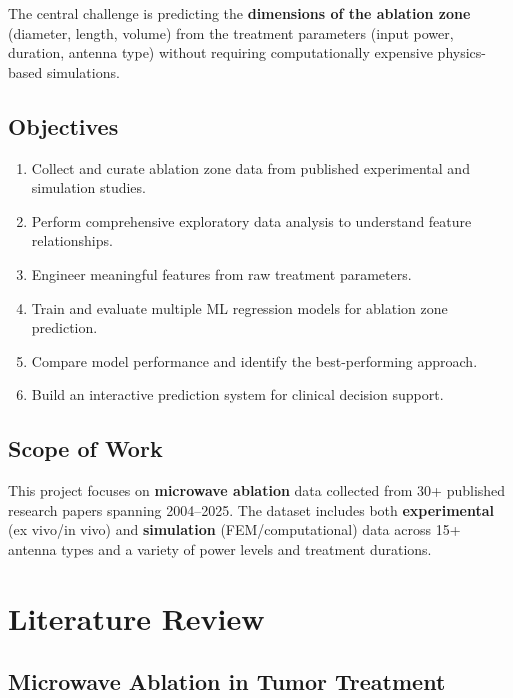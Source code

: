 \documentclass[12pt, a4paper]{article}
\begin{document}
The central challenge is predicting the \textbf{dimensions of the ablation zone} (diameter, length, volume) from the treatment parameters (input power, duration, antenna type) without requiring computationally expensive physics-based simulations.

\subsection{Objectives}
\label{sec:objectives}

\begin{enumerate}
    \item Collect and curate ablation zone data from published experimental and simulation studies.
    \item Perform comprehensive exploratory data analysis to understand feature relationships.
    \item Engineer meaningful features from raw treatment parameters.
    \item Train and evaluate multiple ML regression models for ablation zone prediction.
    \item Compare model performance and identify the best-performing approach.
    \item Build an interactive prediction system for clinical decision support.
\end{enumerate}

\subsection{Scope of Work}
\label{sec:scope}

This project focuses on \textbf{microwave ablation} data collected from 30+ published research papers spanning 2004--2025. The dataset includes both \textbf{experimental} (ex vivo/in vivo) and \textbf{simulation} (FEM/computational) data across 15+ antenna types and a variety of power levels and treatment durations.

\section{Literature Review}
\label{sec:literature-review}

\subsection{Microwave Ablation in Tumor Treatment}
\label{sec:mwa}
\end{document}
